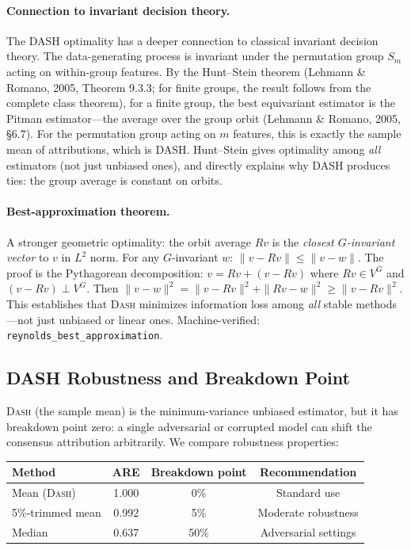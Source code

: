\documentclass{jmlr}
\newcommand{\DASH}{\textsc{Dash}}
\begin{document}
\paragraph{Connection to invariant decision theory.}
The DASH optimality has a deeper connection to classical invariant decision theory. The data-generating process is invariant under the permutation group $S_m$ acting on within-group features. By the Hunt--Stein theorem (Lehmann \& Romano, 2005, Theorem 9.3.3; for finite groups, the result follows from the complete class theorem), for a finite group, the best equivariant estimator is the Pitman estimator---the average over the group orbit (Lehmann \& Romano, 2005, \S 6.7). For the permutation group acting on $m$ features, this is exactly the sample mean of attributions, which is DASH. Hunt--Stein gives optimality among \emph{all} estimators (not just unbiased ones), and directly explains why DASH produces ties: the group average is constant on orbits.

\paragraph{Best-approximation theorem.}
A stronger geometric optimality: the orbit average $Rv$ is the \emph{closest $G$-invariant vector} to $v$ in $L^2$ norm. For any $G$-invariant $w$: $\|v - Rv\| \leq \|v - w\|$. The proof is the Pythagorean decomposition: $v = Rv + (v - Rv)$ where $Rv \in V^G$ and $(v - Rv) \perp V^G$. Then $\|v - w\|^2 = \|v - Rv\|^2 + \|Rv - w\|^2 \geq \|v - Rv\|^2$. This establishes that \DASH{} minimizes information loss among \emph{all} stable methods---not just unbiased or linear ones. Machine-verified: \texttt{reynolds\_best\_approximation}.

\subsection{DASH Robustness and Breakdown Point}
\label{sec:dash-robustness}

\DASH{} (the sample mean) is the minimum-variance unbiased estimator, but it has breakdown point zero: a single adversarial or corrupted model can shift the consensus attribution arbitrarily. We compare robustness properties:

\begin{center}
\small
\begin{tabular}{@{}lccc@{}}
\toprule
Method & ARE & Breakdown point & Recommendation \\
\midrule
Mean (\DASH{}) & 1.000 & 0\% & Standard use \\
5\%-trimmed mean & 0.992 & 5\% & Moderate robustness \\
Median & 0.637 & 50\% & Adversarial settings \\
\bottomrule
\end{tabular}
\end{center}
\end{document}
